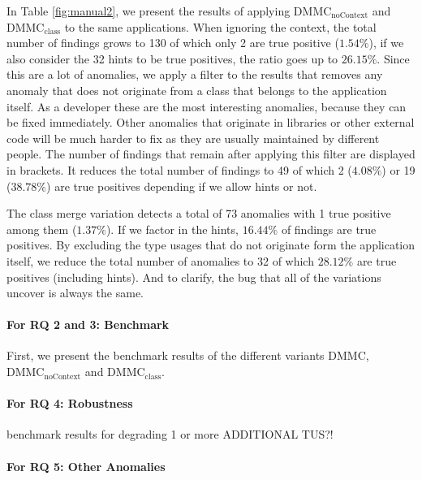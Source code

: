 In Table \ref{fig:manual2}, we present the results of applying $\text{DMMC}_\text{noContext}$ and $\text{DMMC}_\text{class}$ to the same applications.
When ignoring the context, the total number of findings grows to 130 of which only 2 are true positive ($1.54\%$), if we also consider the 32 hints to be true positives, the ratio goes up to $26.15\%$.
Since this are a lot of anomalies, we apply a filter to the results that removes any anomaly that does not originate from a class that belongs to the application itself.
As a developer these are the most interesting anomalies, because they can be fixed immediately.
Other anomalies that originate in libraries or other external code will be much harder to fix as they are usually maintained by different people.
The number of findings that remain after applying this filter are displayed in brackets.
It reduces the total number of findings to 49 of which 2 ($4.08\%$) or 19 ($38.78\%$) are true positives depending if we allow hints or not.

The class merge variation detects a total of 73 anomalies with 1 true positive among them ($1.37\%$).
If we factor in the hints, $16.44\%$ of findings are true positives.
By excluding the type usages that do not originate form the application itself, we reduce the total number of anomalies to 32 of which $28.12\%$ are true positives (including hints).
And to clarify, the bug that all of the variations uncover is always the same.

\paragraph{For RQ 2 and 3: Benchmark}

First, we present the benchmark results of the different variants $\text{DMMC}$, $\text{DMMC}_\text{noContext}$ and $\text{DMMC}_\text{class}$.


\paragraph{For RQ 4: Robustness}

benchmark results for degrading 1 or more ADDITIONAL TUS?!

\paragraph{For RQ 5: Other Anomalies}

